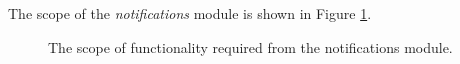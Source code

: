 The scope of the \emph{notifications} module is shown in Figure \ref{fig:notifications_scope}. 

\begin{figure}[htb]
\begin{center}
\end{center}
\caption{The scope of functionality required from the notifications module. \label{fig:notifications_scope}}
\end{figure}


